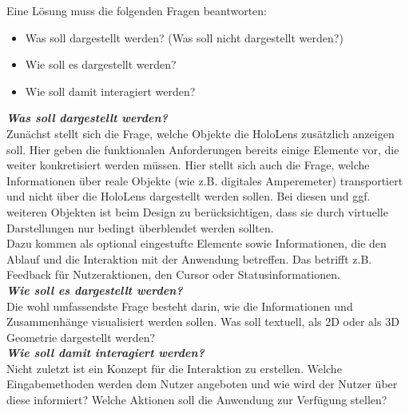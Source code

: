Eine Lösung muss die folgenden Fragen beantworten:
\begin{itemize}
	\setlength{\itemsep}{-5pt}
	\item Was soll dargestellt werden? (Was soll nicht dargestellt werden?)
	\item Wie soll es dargestellt werden?
	\item Wie soll damit interagiert werden?
\end{itemize}

\textbf{\textit{Was soll dargestellt werden?}}\\
Zunächst stellt sich die Frage, welche Objekte die HoloLens zusätzlich anzeigen soll. Hier geben die funktionalen Anforderungen bereits einige Elemente vor, die weiter konkretisiert werden müssen. Hier stellt sich auch die Frage, welche Informationen über reale Objekte (wie z.B. digitales Amperemeter) transportiert und nicht über die HoloLens dargestellt werden sollen. Bei diesen und ggf. weiteren Objekten ist beim Design zu berücksichtigen, dass sie durch virtuelle Darstellungen nur bedingt überblendet werden sollten.\\

Dazu kommen als optional eingestufte Elemente sowie Informationen, die den Ablauf und die Interaktion mit der Anwendung betreffen. Das betrifft z.B. Feedback für Nutzeraktionen, den Cursor oder Statusinformationen.\\

\textbf{\textit{Wie soll es dargestellt werden?}}\\
Die wohl umfassendste Frage besteht darin, wie die Informationen und Zusammenhänge visualisiert werden sollen. Was soll textuell, als 2D oder als 3D Geometrie dargestellt werden? \\

\textbf{\textit{Wie soll damit interagiert werden?}}\\
Nicht zuletzt ist ein Konzept für die Interaktion zu erstellen. Welche Eingabemethoden werden dem Nutzer angeboten und wie wird der Nutzer über diese informiert? Welche Aktionen soll die Anwendung zur Verfügung stellen?\\

